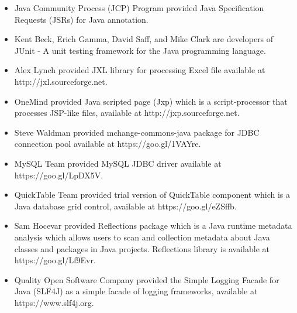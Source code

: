 \documentclass[a4paper]{llncs}
\begin{document}
\begin{itemize}
\item Java Community Process (JCP) Program provided Java Specification Requests (JSRs) for Java annotation.
\item Kent Beck, Erich Gamma, David Saff, and Mike Clark are developers of JUnit - A unit testing framework for the Java programming language.
\item Alex Lynch provided JXL library for processing Excel file available at http://jxl.sourceforge.net.
\item OneMind provided Java scripted page (Jxp) which is a script-processor that processes JSP-like files, available at http://jxp.sourceforge.net.
\item Steve Waldman provided mchange-commons-java package for JDBC connection pool available at https://goo.gl/1VAYre.
\item MySQL Team provided MySQL JDBC driver available at https://goo.gl/LpDX5V.
\item QuickTable Team provided trial version of QuickTable component which is a Java database grid control, available at https://goo.gl/eZSffb.
\item Sam Hocevar provided Reflections package which is a Java runtime metadata analysis which allows users to scan and collection metadata about Java classes and packages in Java projects. Reflections library is available at https://goo.gl/Lf9Evr.
\item Quality Open Software Company provided the Simple Logging Facade for Java (SLF4J) as a simple facade of logging frameworks, available at https://www.slf4j.org.
\end{itemize}


{\small
}
\end{document}

